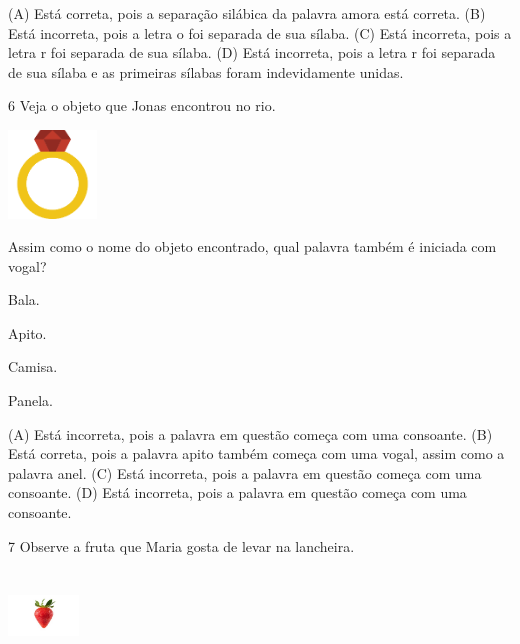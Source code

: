 (A) Está correta, pois a separação silábica da palavra amora está correta.
(B) Está incorreta, pois a letra o foi separada de sua sílaba.
(C) Está incorreta, pois a letra r foi separada de sua sílaba.
(D) Está incorreta, pois a letra r foi separada de sua sílaba e as primeiras sílabas foram indevidamente unidas.

\num{6} Veja o objeto que Jonas encontrou no rio.

\includegraphics[width=0.92222in,height=0.92222in]{media/image151.png}


Assim como o nome do objeto encontrado, qual palavra também é iniciada com vogal?

\begin{minipage}{.5\textwidth}
\begin{escolha}
\item Bala.

\item Apito.

\item Camisa.

\item Panela.
\end{escolha}
\end{minipage}

(A) Está incorreta, pois a palavra em questão começa com uma consoante.
(B) Está correta, pois a palavra apito também começa com uma vogal, assim como a palavra anel.
(C) Está incorreta, pois a palavra em questão começa com uma consoante.
(D) Está incorreta, pois a palavra em questão começa com uma consoante.

\num{7} Observe a fruta que Maria gosta de levar na lancheira.

\includegraphics[width=0.73819in,height=0.93750in]{media/image152.jpeg}

